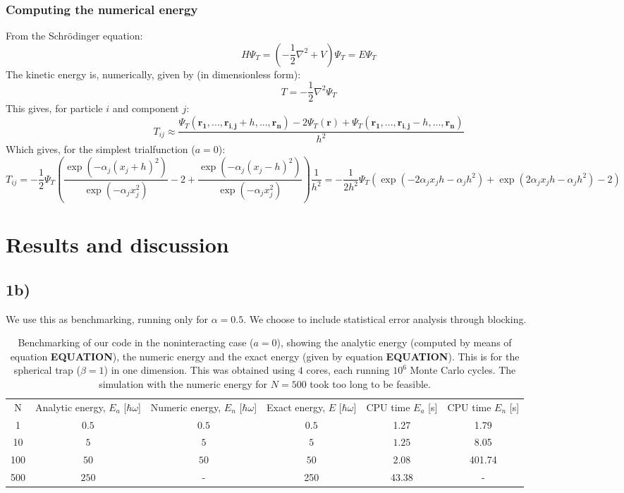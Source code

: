 \documentclass[a4paper, 10pt]{article}
\begin{document}
	\subsubsection{Computing the numerical energy}
	From the Schrödinger equation:
	\begin{equation}
	\hat{H}\Psi_T = \left(-\frac{1}{2}\nabla^2+V\right)\Psi_T= E\Psi_T
	\end{equation}
	The kinetic energy is, numerically, given by (in dimensionless form):
	\begin{equation}
	T=-\frac{1}{2}\nabla^2 \Psi_T
	\end{equation}
	This gives, for particle $i$ and component $j$:
	\begin{equation}
	T_{ij} \approx \frac{\Psi_T(\boldsymbol{r_1},...,\boldsymbol{r_{i,j}}+h,...,\boldsymbol{r_n})-2\Psi_T(\boldsymbol{r})+\Psi_T(\boldsymbol{r_1},...,\boldsymbol{r_{i,j}}-h,...,\boldsymbol{r_n})}{h^2}
	\end{equation}
	Which gives, for the simplest trialfunction ($a=0$):
	\small
	\begin{equation}
	T_{ij}=-\frac{1}{2}\Psi_T\left(\frac{\exp(-\alpha_j (x_j+h)^2)}{\exp(-\alpha_j x_j^2)}-2+\frac{\exp(-\alpha_j ( x_j -h)^2)}{\exp(-\alpha_j x_j^2)}\right)\frac{1}{h^2}=-\frac{1}{2h^2}\Psi_T\left(\exp(-2\alpha_j x_j h-\alpha_jh^2)+\exp(2\alpha_j x_j h-\alpha_j h^2)-2\right)
	\end{equation}
	\normalsize
	
	
	\section{Results and discussion}
	\subsection{1b)}
	We use this as benchmarking, running only for $\alpha=0.5$. We choose to include statistical error analysis through blocking. 
	\begin{table}[ht!]
		 \begin{adjustwidth}{-2cm}{}
		\begin{tabular}{cccccc}
			N & Analytic energy, $E_a$ [$\hbar \omega$] & Numeric energy, $E_n$ [$\hbar \omega$] & Exact energy, $E$ [$\hbar \omega$]& CPU time $E_a$ [s] &CPU time $E_n$ [s]\\
			1&$0.5$&$0.5$&$0.5$& 1.27&1.79\\
			10&$5$&$5$&$5$& $1.25$&8.05\\
			100&$50$&$50$&$50$&2.08&401.74\\
			500&$250$&-&250 &43.38 &-
		\end{tabular}
	 \end{adjustwidth}
	 \caption{Benchmarking of our code in the noninteracting case ($a=0$), showing the analytic energy (computed by means of equation \textbf{EQUATION}), the numeric energy and the exact energy (given by equation \textbf{EQUATION}). This is for the spherical trap ($\beta=1$) in one dimension. This was obtained using $4$ cores, each running $10^6$ Monte Carlo cycles. The simulation with the numeric energy for $N=500$ took too long to be feasible.}
	\end{table}
\end{document}
